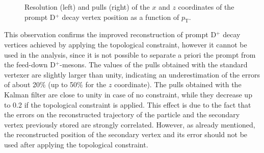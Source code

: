 \documentclass[b5paper,10pt,twoside,oldstyle,classica]{toptesi}
\newcommand{\pt}{p_\text{T}}
\begin{document}
\begin{figure}[tb]
\begin{center}
\caption{Resolution (left) and pulls (right) of the $x$ and $z$ coordinates of the prompt D$^+$ decay vertex position as a function of $\pt$.}
\label{KF_decayvtx}
\end{center}
\end{figure} This observation confirms the improved reconstruction of prompt D$^+$ decay vertices achieved by applying the topological constraint, however it cannot be used in the analysis, since it is not possible to separate a priori the prompt from the feed-down D$^+$-mesons. The values of the pulls obtained with the standard vertexer are slightly larger than unity, indicating an underestimation of the errors of about 20\% (up to 50\% for the $z$ coordinate). The pulls obtained with the Kalman filter are close to unity in case of no constraint, while they decrease up to 0.2 if the topological constraint is applied. This effect is due to the fact that the errors on the reconstructed trajectory of the particle and the secondary vertex previously stored are strongly correlated. However, as already mentioned, the reconstructed position of the secondary vertex and its error should not be used after applying the topological constraint. 
\end{document}
